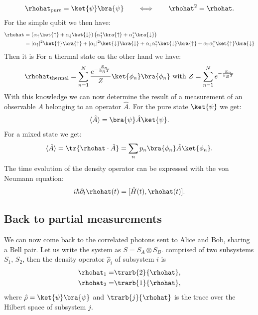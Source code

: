 \begin{align}
	\rhohat_{\text{pure}} = \ket{\psi}\bra{\psi} \qquad \Longleftrightarrow \qquad \rhohat^2 = \rhohat.
\end{align}
For the simple qubit we then have:
\begin{align}
  \rhohat &= \left(\alpha_\uparrow\ket{\uparrow}+\alpha_\downarrow\ket{\downarrow}\right)\left(\alpha_\uparrow^*\bra{\uparrow}+\alpha_\downarrow^*\bra{\downarrow}\right)\\
  &= |\alpha_\uparrow|^2\ket{\uparrow}\bra{\uparrow}+|\alpha_\downarrow|^2\ket{\downarrow}\bra{\downarrow}+\alpha_\downarrow\alpha_\uparrow^*\ket{\downarrow}\bra{\uparrow}+\alpha_\uparrow\alpha_\downarrow^*\ket{\uparrow}\bra{\downarrow}
\end{align}
Then it is 
For a thermal state on the other hand we have:
\begin{align}
	\rhohat_{\text{thermal}} = \sum_{n=1}^N \frac{e^{-\frac{E_n}{k_BT}}}{Z} \ket{\phi_n}\bra{\phi_n}\text{ with }Z = \sum_{n=1}^N e^{-\frac{E_n}{k_BT}}
\end{align}
With this knowledge we can now determine the result of a measurement of an observable $A$ belonging to an operator $\hat{A}$. For the pure state $\ket{\psi}$ we get:
%
\begin{align}
				\langle \hat{A}\rangle = \bra{\psi} \hat{A} \ket{\psi}.
\end{align}
For a mixed state we get:
\begin{align}
	\langle \hat{A}\rangle = \tr{\rhohat \cdot \hat{A}} = \sum_n {p_n} \bra{\phi_n} \hat{A} \ket{\phi_n}.
\end{align}
The time evolution of the density operator can be expressed with the von Neumann equation:
\begin{align}
	i\hbar \partial_{t}\rhohat(t) = [\hat{H}(t),\rhohat(t)].
\end{align}

\subsection{Back to partial measurements}

We can now come back to the correlated photons sent to Alice and Bob, sharing a Bell pair. Let us write the system as $S = S_A \otimes S_B$.  comprised of two subsystems $S_1$, $S_2$, then the density operator $\hat{\rho}_i$ of  subsystem $i$ is
					\begin{align}
						\rhohat_1=&\trarb{2}{\rhohat},\\
						\rhohat_2=&\trarb{1}{\rhohat},
					\end{align}
					where $\hat{\rho}=\ket{\psi}\bra{\psi}$ and $\trarb{j}{\rhohat}$ is the trace over the Hilbert space of subsystem $j$.
